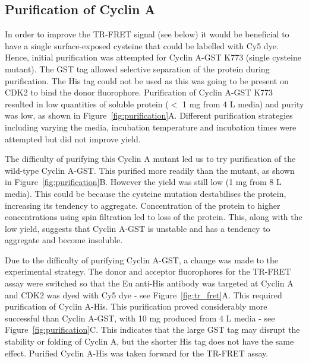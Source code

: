 \subsection{Purification of Cyclin A}

In order to improve the TR-FRET signal (see below) it would be beneficial to have a single surface-exposed cysteine that could be labelled with Cy5 dye.
Hence, initial purification was attempted for Cyclin A-GST K773 (single cysteine mutant).
The GST tag allowed selective separation of the protein during purification.
The His tag could not be used as this was going to be present on CDK2 to bind the donor fluorophore.
Purification of Cyclin A-GST K773 resulted in low quantities of soluble protein ($<$ 1 mg from 4 L media) and purity was low, as shown in Figure~\ref{fig:purification}A.
Different purification strategies including varying the media, incubation temperature and incubation times were attempted but did not improve yield.

The difficulty of purifying this Cyclin A mutant led us to try purification of the wild-type Cyclin A-GST.
This purified more readily than the mutant, as shown in Figure~\ref{fig:purification}B.
However the yield was still low (1 mg from 8 L media).
This could be because the cysteine mutation destabilises the protein, increasing its tendency to aggregate.
Concentration of the protein to higher concentrations using spin filtration led to loss of the protein.
This, along with the low yield, suggests that Cyclin A-GST is unstable and has a tendency to aggregate and become insoluble.

Due to the difficulty of purifying Cyclin A-GST, a change was made to the experimental strategy.
The donor and acceptor fluorophores for the TR-FRET assay were switched so that the Eu anti-His antibody was targeted at Cyclin A and CDK2 was dyed with Cy5 dye - see Figure~\ref{fig:tr_fret}A.
This required purification of Cyclin A-His.
This purification proved considerably more successful than Cyclin A-GST, with 10 mg produced from 4 L media - see Figure~\ref{fig:purification}C.
This indicates that the large GST tag may disrupt the stability or folding of Cyclin A, but the shorter His tag does not have the same effect.
Purified Cyclin A-His was taken forward for the TR-FRET assay.


